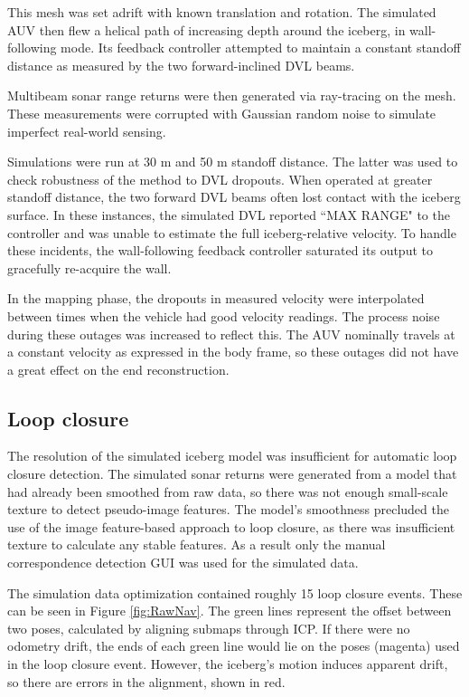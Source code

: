This mesh was set adrift with known translation and rotation. The simulated AUV then flew a helical path of increasing depth around the iceberg, in wall-following mode. Its feedback controller attempted to maintain a constant standoff distance as measured by the two forward-inclined DVL beams.

Multibeam sonar range returns were then generated via ray-tracing on the mesh. These measurements were corrupted with Gaussian random noise to simulate imperfect real-world sensing. 

Simulations were run at 30 m and 50 m standoff distance. The latter was used to check robustness of the method to DVL dropouts. When operated at greater standoff distance, the two forward DVL beams often lost contact with the iceberg surface. In these instances, the simulated DVL reported ``MAX RANGE" to the controller and was unable to estimate the full iceberg-relative velocity. To handle these incidents, the wall-following feedback controller saturated its output to gracefully re-acquire the wall. 

In the mapping phase, the dropouts in measured velocity were interpolated between times when the vehicle had good velocity readings. The process noise during these outages was increased to reflect this. The AUV nominally travels at a constant velocity as expressed in the body frame, so these outages did not have a great effect on the end reconstruction.

\subsection{Loop closure}

The resolution of the simulated iceberg model was insufficient for automatic loop closure detection. The simulated sonar returns were generated from a model that had already been smoothed from raw data, so there was not enough small-scale texture to detect pseudo-image features. The model's smoothness precluded the use of the image feature-based approach to loop closure, as there was insufficient texture to calculate any stable features. As a result only the manual correspondence detection GUI was used for the simulated data. 

The simulation data optimization contained roughly 15 loop closure events. These can be seen in Figure \ref{fig:RawNav}. The green lines represent the offset between two poses, calculated by aligning submaps through ICP. If there were no odometry drift, the ends of each green line would lie on the poses (magenta) used in the loop closure event. However, the iceberg's motion induces apparent drift, so there are errors in the alignment, shown in red.

